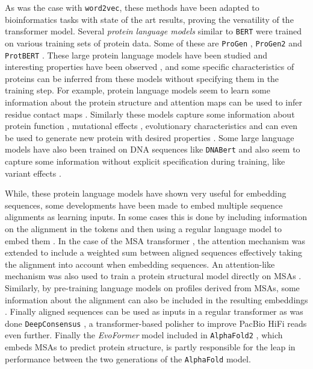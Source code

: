 \documentclass[
  11pt,
  twoside,
  BCOR=10mm,
  listof=totoc]{scrbook}
\begin{document}
As was the case with \texttt{word2vec}, these methods have been adapted to bioinformatics tasks with state of the art results, proving the versatility of the transformer model. Several \emph{protein language models} similar to \texttt{BERT} were trained on various training sets of protein data. Some of these are \texttt{ProGen} \autocite{madaniProGenLanguageModeling2020}, \texttt{ProGen2} \autocite{eriknijkampProGen2ExploringBoundaries2022} and \texttt{ProtBERT} \autocite{elnaggarProtTransCrackingLanguage2021}. These large protein language models have been studied and interesting properties have been observed \autocite{beplerLearningProteinLanguage2021}, and some specific characteristics of proteins can be inferred from these models without specifying them in the training step. For example, protein language models seem to learn some information about the protein structure and attention maps can be used to infer residue contact maps \autocite{raoTransformerProteinLanguage2020,rivesBiologicalStructureFunction2019,bhattacharyaSingleLayersAttention2020}. Similarly these models capture some information about protein function \autocite{huExploringEvolutionbasedFree2022}, mutational effects \autocite{meierLanguageModelsEnable2021}, evolutionary characteristics \autocite{hieEvolutionaryVelocityProtein2022} and can even be used to generate new protein with desired properties \autocite{madaniProGenLanguageModeling2020}. Some large language models have also been trained on DNA sequences like \texttt{DNABert} \autocite{jiDNABERTPretrainedBidirectional2021} and also seem to capture some information without explicit specification during training, like variant effects \autocite{benegasDNALanguageModels2022}.

While, these protein language models have shown very useful for embedding sequences, some developments have been made to embed multiple sequence alignments as learning inputs. In some cases this is done by including information on the alignment in the tokens and then using a regular language model to embed them \autocite{caiGenomewidePredictionSmall2020}. In the case of the MSA transformer \autocite{raoMSATransformer2021}, the attention mechanism was extended to include a weighted sum between aligned sequences effectively taking the alignment into account when embedding sequences. An attention-like mechanism was also used to train a protein structural model directly on MSAs \autocite{sercuNeuralPottsModel2021}. Similarly, by pre-training language models on profiles derived from MSAs, some information about the alignment can also be included in the resulting embeddings \autocite{sturmfelsProfilePredictionAlignmentBased2020}. Finally aligned sequences can be used as inputs in a regular transformer as was done \texttt{DeepConsensus} \autocite{baidDeepConsensusImprovesAccuracy2022}, a transformer-based polisher to improve PacBio HiFi reads even further. Finally the \emph{EvoFormer} model included in \texttt{AlphaFold2} \autocite{jumperHighlyAccurateProtein2021}, which embeds MSAs to predict protein structure, is partly responsible for the leap in performance between the two generations of the \texttt{AlphaFold} model.
\end{document}

